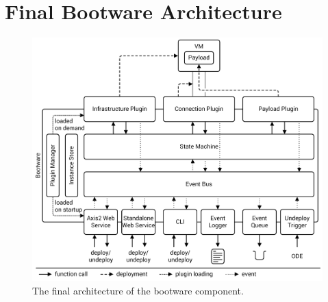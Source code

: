 \section{Final Bootware Architecture}
\label{finalarch}

\begin{figure}[!htbp]
	\centering
	\includegraphics[resolution=600]{design/assets/final_bootware_architecture}
	\caption{The final architecture of the bootware component.}
	\label{image:finalarch}
\end{figure}
